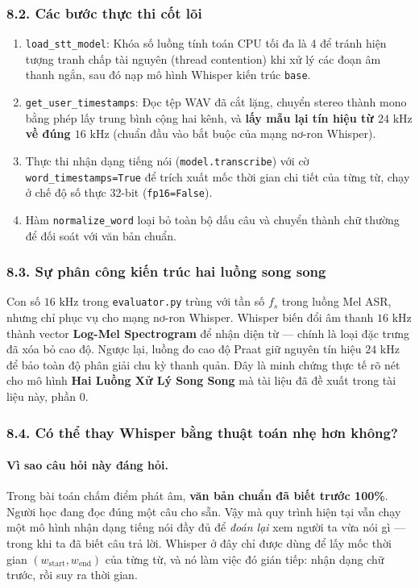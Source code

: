 \documentclass[11pt,a4paper]{article}
\begin{document}
\subsubsection*{8.2. Các bước thực thi cốt lõi}
\begin{enumerate}
    \setlength{\itemsep}{0.5pt}
    \item \texttt{load\_stt\_model}: Khóa số luồng tính toán CPU tối đa là 4 để tránh hiện tượng tranh chấp tài nguyên (thread contention) khi xử lý các đoạn âm thanh ngắn, sau đó nạp mô hình Whisper kiến trúc \texttt{base}.
    \item \texttt{get\_user\_timestamps}: Đọc tệp WAV đã cắt lặng, chuyển stereo thành mono bằng phép lấy trung bình cộng hai kênh, và \textbf{lấy mẫu lại tín hiệu từ $24\text{ kHz}$ về đúng $16\text{ kHz}$} (chuẩn đầu vào bắt buộc của mạng nơ-ron Whisper).
    \item Thực thi nhận dạng tiếng nói (\texttt{model.transcribe}) với cờ \texttt{word\_timestamps=True} để trích xuất mốc thời gian chi tiết của từng từ, chạy ở chế độ số thực 32-bit (\texttt{fp16=False}).
    \item Hàm \texttt{normalize\_word} loại bỏ toàn bộ dấu câu và chuyển thành chữ thường để đối soát với văn bản chuẩn.
\end{enumerate}

\subsubsection*{8.3. Sự phân công kiến trúc hai luồng song song}
Con số $16\text{ kHz}$ trong \texttt{evaluator.py} trùng với tần số $f_s$ trong luồng Mel ASR, nhưng chỉ phục vụ cho mạng nơ-ron Whisper. Whisper biến đổi âm thanh $16\text{ kHz}$ thành vector \textbf{Log-Mel Spectrogram} để nhận diện từ --- chính là loại đặc trưng đã xóa bỏ cao độ. Ngược lại, luồng đo cao độ Praat giữ nguyên tín hiệu $24\text{ kHz}$ để bảo toàn độ phân giải chu kỳ thanh quản. Đây là minh chứng thực tế rõ nét cho mô hình \textbf{Hai Luồng Xử Lý Song Song} mà tài liệu đã đề xuất trong tài liệu này, phần 0.


\subsubsection*{8.4. Có thể thay Whisper bằng thuật toán nhẹ hơn không?}

\paragraph{Vì sao câu hỏi này đáng hỏi.}
Trong bài toán chấm điểm phát âm, \textbf{văn bản chuẩn đã biết trước 100\%}. Người học đang đọc đúng một câu cho sẵn. Vậy mà quy trình hiện tại vẫn chạy một mô hình nhận dạng tiếng nói đầy đủ để \emph{đoán lại} xem người ta vừa nói gì --- trong khi ta đã biết câu trả lời. Whisper ở đây chỉ được dùng để lấy mốc thời gian $(w_{\text{start}}, w_{\text{end}})$ của từng từ, và nó làm việc đó gián tiếp: nhận dạng chữ trước, rồi suy ra thời gian.
\end{document}
